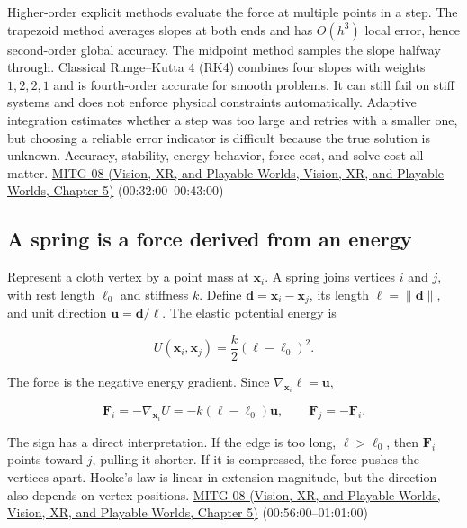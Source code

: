 Higher-order explicit methods evaluate the force at multiple points in a step. The trapezoid method averages slopes at both ends and has \(O(h^3)\) local error, hence second-order global accuracy. The midpoint method samples the slope halfway through. Classical Runge--Kutta 4 (RK4) combines four slopes with weights \(1,2,2,1\) and is fourth-order accurate for smooth problems. It can still fail on stiff systems and does not enforce physical constraints automatically. Adaptive integration estimates whether a step was too large and retries with a smaller one, but choosing a reliable error indicator is difficult because the true solution is unknown. Accuracy, stability, energy behavior, force cost, and solve cost all matter. \href{../07-Vision-XR-and-Playable-Worlds/main.pdf\#nameddest=04-visual-computing-ii-ch036-mitg-08---cloth-simulation}{MITG-08 (Vision, XR, and Playable Worlds, Vision, XR, and Playable Worlds, Chapter 5)} (00:32:00--00:43:00)

\subsection{A spring is a force derived from an energy}\label{04-visual-computing-ii-ch029-a-spring-is-a-force-derived-from-an-energy}

Represent a cloth vertex by a point mass at \(\boldsymbol{x}_i\). A spring joins vertices \(i\) and \(j\), with rest length \(\ell_0\) and stiffness \(k\). Define \(\boldsymbol{d}=\boldsymbol{x}_i-\boldsymbol{x}_j\), its length \(\ell=\|\boldsymbol{d}\|\), and unit direction \(\boldsymbol{u}=\boldsymbol{d}/\ell\). The elastic potential energy is

\[
U(\boldsymbol{x}_i,\boldsymbol{x}_j)=\frac{k}{2}(\ell-\ell_0)^2.
\]

The force is the negative energy gradient. Since \(\nabla_{\boldsymbol{x}_i}\ell=\boldsymbol{u}\),

\[
\boldsymbol{F}_i=-\nabla_{\boldsymbol{x}_i}U
=-k(\ell-\ell_0)\boldsymbol{u},\qquad
\boldsymbol{F}_j=-\boldsymbol{F}_i.
\]

The sign has a direct interpretation. If the edge is too long, \(\ell>\ell_0\), then \(\boldsymbol{F}_i\) points toward \(j\), pulling it shorter. If it is compressed, the force pushes the vertices apart. Hooke's law is linear in extension magnitude, but the direction also depends on vertex positions. \href{../07-Vision-XR-and-Playable-Worlds/main.pdf\#nameddest=04-visual-computing-ii-ch036-mitg-08---cloth-simulation}{MITG-08 (Vision, XR, and Playable Worlds, Vision, XR, and Playable Worlds, Chapter 5)} (00:56:00--01:01:00)

